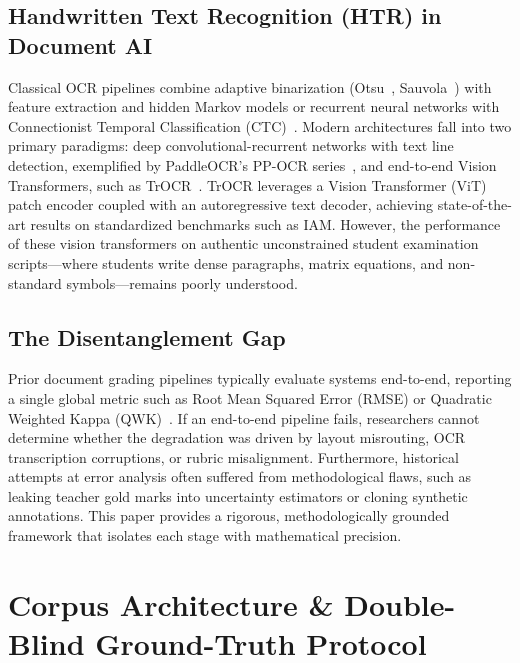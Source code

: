 \documentclass[journal]{IEEEtran}
\begin{document}
\subsection{Handwritten Text Recognition (HTR) in Document AI}
Classical OCR pipelines combine adaptive binarization (Otsu~\cite{otsu1979threshold}, Sauvola~\cite{sauvola2000adaptive}) with feature extraction and hidden Markov models or recurrent neural networks with Connectionist Temporal Classification (CTC)~\cite{smith2007overview, graves2006connectionist}. Modern architectures fall into two primary paradigms: deep convolutional-recurrent networks with text line detection, exemplified by PaddleOCR's PP-OCR series~\cite{du2020ppocr}, and end-to-end Vision Transformers, such as TrOCR~\cite{li2023trocr}. TrOCR leverages a Vision Transformer (ViT) patch encoder coupled with an autoregressive text decoder, achieving state-of-the-art results on standardized benchmarks such as IAM. However, the performance of these vision transformers on authentic unconstrained student examination scripts—where students write dense paragraphs, matrix equations, and non-standard symbols—remains poorly understood.

\subsection{The Disentanglement Gap}
Prior document grading pipelines typically evaluate systems end-to-end, reporting a single global metric such as Root Mean Squared Error (RMSE) or Quadratic Weighted Kappa (QWK)~\cite{cohen1968weighted}. If an end-to-end pipeline fails, researchers cannot determine whether the degradation was driven by layout misrouting, OCR transcription corruptions, or rubric misalignment. Furthermore, historical attempts at error analysis often suffered from methodological flaws, such as leaking teacher gold marks into uncertainty estimators or cloning synthetic annotations. This paper provides a rigorous, methodologically grounded framework that isolates each stage with mathematical precision.

\section{Corpus Architecture \& Double-Blind Ground-Truth Protocol}
\end{document}
